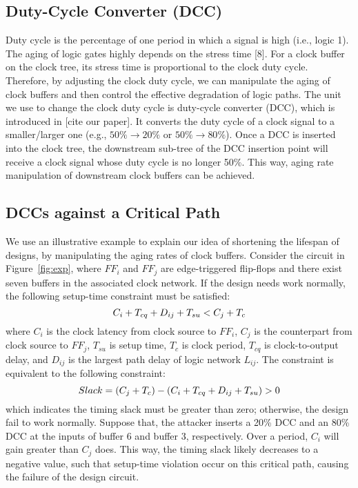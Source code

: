 \subsection{Duty-Cycle Converter (DCC)}
Duty cycle is the percentage of one period in which a signal is high (i.e., logic 1). The aging of logic gates highly depends on the stress time [8]. For a clock buffer on the clock tree, its stress time is proportional to the clock duty cycle. Therefore, by adjusting the clock duty cycle, we can manipulate the aging of clock buffers and then control the effective degradation of logic paths. The unit we use to change the clock duty cycle is duty-cycle converter (DCC), which is introduced in [cite our paper]. It converts the duty cycle of a clock signal to a smaller/larger one (e.g., $50\% \rightarrow 20\%$ or $50\% \rightarrow 80\%$). Once a DCC is inserted into the clock tree, the downstream sub-tree of the DCC insertion point will receive a clock signal whose duty cycle is no longer 50\%. This way, aging rate manipulation of downstream clock buffers can be achieved.
\subsection{DCCs against a Critical Path}
We use an illustrative example to explain our idea of shortening the lifespan of designs, by manipulating the aging rates of clock buffers. Consider the circuit in Figure~\ref{fig:exp}, where $FF_{i}$ and $FF_{j}$ are edge-triggered flip-flops and there exist seven buffers in the associated clock network. If the design needs work normally, the following setup-time constraint must be satisfied:
\begin{equation}
	\label{eq:setup}
	\fontsize{8}{9} \selectfont
	C_{i} + T_{cq} + D_{ij} + T_{su} < C_{j} + T_{c}
\end{equation}
where $C_{i}$ is the clock latency from clock source to $FF_{i}$, $C_{j}$ is the counterpart from clock source to $FF_{j}$, $T_{su}$ is setup time, $T_{c}$ is clock period, $T_{cq}$ is clock-to-output delay, and $D_{ij}$ is the largest path delay of logic network $L_{ij}$. The constraint is equivalent to the following constraint: 
\begin{equation}
	\label{eq:setup}
	Slack = (C_{j} + T_{c}) - (C_{i}  + T_{cq} + D_{ij} + T_{su}) > 0 
	\fontsize{8}{9} \selectfont
\end{equation}
which indicates the timing slack must be greater than zero; otherwise, the design fail to work normally. Suppose that, the attacker inserts a 20\% DCC and an 80\% DCC at the inputs of buffer 6 and buffer 3, respectively. Over a period, $C_{i}$ will gain greater than $C_{j}$ does. This way, the timing slack likely decreases to a negative value, such that setup-time violation occur on this critical path, causing the failure of the design circuit.